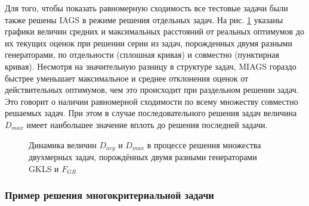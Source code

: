 Для того, чтобы показать равномерную сходимость все тестовые задачи были также решены IAGS
в режиме решения отдельных задач. На рис. \ref{fig:devs_mixed} указаны графики величин
средних и максимальных расстояний от реальных оптимумов до их текущих оценок при решении
серии из задач, порожденных двумя разными генераторами, по отдельности (сплошная кривая) и совместно (пунктирная кривая).
Несмотря на значительную разницу в структуре задач, MIAGS
гораздо быстрее уменьшает максимальное и среднее отклонения оценок от действительных оптимумов, чем это происходит при раздельном решении задач.
Это говорит о наличии равномерной сходимости по всему множеству совместно решаемых задач.
При этом в случае последовательного решения задач величина \(D_{max}\) имеет наибольшее значение вплоть
до решения последней задачи.

\begin{figure}[ht]
    \centering
    \caption{Динамика величин \(D_{avg}\) и \(D_{max}\) в процессе решения множества двухмерных задач,
    порождённых двумя разными генераторами GKLS и \(F_{GR}\)}
    \label{fig:devs_mixed}
\end{figure}

\subsubsection{Пример решения многокритериальной задачи}

